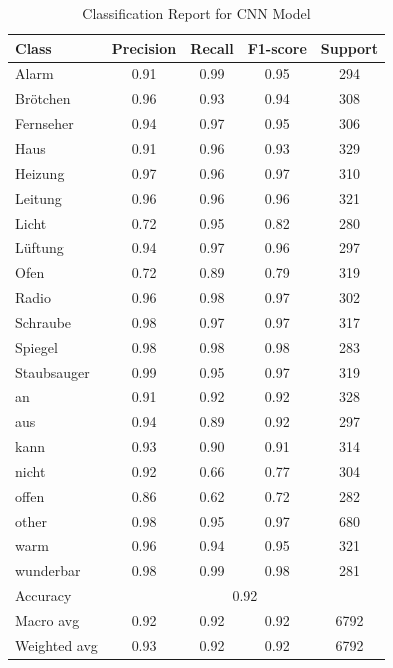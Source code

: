 \begin{table}
  \caption{Classification Report for CNN Model}
  \label{tab:cnn_classification_report}
  \centering
  \begin{tabular}{lcccc}
    \toprule
    Class        & Precision & Recall & F1-score & Support \\
    \midrule
    Alarm        & 0.91 & 0.99 & 0.95 & 294 \\
    Brötchen     & 0.96 & 0.93 & 0.94 & 308 \\
    Fernseher    & 0.94 & 0.97 & 0.95 & 306 \\
    Haus         & 0.91 & 0.96 & 0.93 & 329 \\
    Heizung      & 0.97 & 0.96 & 0.97 & 310 \\
    Leitung      & 0.96 & 0.96 & 0.96 & 321 \\
    Licht        & 0.72 & 0.95 & 0.82 & 280 \\
    Lüftung      & 0.94 & 0.97 & 0.96 & 297 \\
    Ofen         & 0.72 & 0.89 & 0.79 & 319 \\
    Radio        & 0.96 & 0.98 & 0.97 & 302 \\
    Schraube     & 0.98 & 0.97 & 0.97 & 317 \\
    Spiegel      & 0.98 & 0.98 & 0.98 & 283 \\
    Staubsauger  & 0.99 & 0.95 & 0.97 & 319 \\
    an           & 0.91 & 0.92 & 0.92 & 328 \\
    aus          & 0.94 & 0.89 & 0.92 & 297 \\
    kann         & 0.93 & 0.90 & 0.91 & 314 \\
    nicht        & 0.92 & 0.66 & 0.77 & 304 \\
    offen        & 0.86 & 0.62 & 0.72 & 282 \\
    other        & 0.98 & 0.95 & 0.97 & 680 \\
    warm         & 0.96 & 0.94 & 0.95 & 321 \\
    wunderbar    & 0.98 & 0.99 & 0.98 & 281 \\
    \midrule
    Accuracy     & \multicolumn{4}{c}{0.92} & 6792 \\
    Macro avg    & 0.92 & 0.92 & 0.92 & 6792 \\
    Weighted avg & 0.93 & 0.92 & 0.92 & 6792 \\
    \bottomrule
  \end{tabular}
\end{table}
